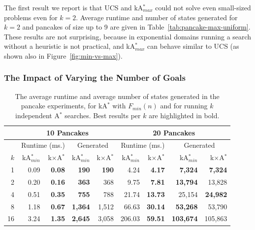 \documentclass{aicom2e}
\newcommand{\astar}{A$^*$}
\newcommand{\kastar}{kA$^*$}
\newcommand{\kastarmin}{kA$^*_{min}$}
\newcommand{\kastarmax}{kA$^*_{max}$}
\newcommand{\kxastar}{k$\times$A$^*$}
\newcommand{\minf}{$F_{min}(n)$}
\begin{document}
The first result we report is that UCS and \kastarmax{} could not solve even
small-sized problems even for $k=2$. Average runtime and number of states
generated  for $k=2$ and pancakes of size up to 9 are given in
Table~\ref{tab:pancake-max-uniform}. These results are not surprising, because
in exponential domains running a search without a heuristic is not practical,
and \kastarmax{} can behave similar to UCS (as shown also in
Figure~\ref{fig:min-vs-max}).


\subsubsection{The Impact of Varying the Number of Goals}


\begin{table}[]


            \centering
        \begin{tabular}{|r|r|r|r|r|r|r|r|r|}
            \hline
            & \multicolumn{4}{c|}{{\bf 10 Pancakes}} & \multicolumn{4}{c|}{{\bf 20 Pancakes}}    \\
            \hline
            & \multicolumn{2}{c|}{Runtime (ms.)}   & \multicolumn{2}{c|}{Generated}    & \multicolumn{2}{c|}{Runtime (ms.)}   & \multicolumn{2}{c|}{Generated}    \\
            \hline
            $k$ & \kastarmin{} & \kxastar{} & \kastarmin{} & \kxastar{} & \kastarmin{} & \kxastar{} & \kastarmin{} & \kxastar{}  \\ \hline

1           & 0.09                  & \textbf{0.08}       & \textbf{190}          & \textbf{190}        & 4.24                  & \textbf{4.17}       & \textbf{7,324}        & \textbf{7,324}      \\
2           & 0.20                  & \textbf{0.16}       & \textbf{363}          & 368                 & 9.75                  & \textbf{7.81}       & \textbf{13,794}       & 13,828              \\
4           & 0.51                  & \textbf{0.35}       & \textbf{755}          & 788                 & 21.74                 & \textbf{13.73}      & 25,154                & \textbf{24,982}     \\
8           & 1.18                  & \textbf{0.67}       & \textbf{1,364}        & 1,512               & 66.63                 & \textbf{30.14}      & \textbf{53,268}       & 53,790              \\
16          & 3.24                  & \textbf{1.35}       & \textbf{2,645}        & 3,058               & 206.03                & \textbf{59.51}      & \textbf{103,674}       & 105,863     \\ \hline
    \end{tabular}
    \caption{The average runtime and average number of states generated in the pancake experiments, for \kastar{} with \minf{} and for running $k$ independent \astar{} searches. Best results per $k$ are highlighted in bold.}
    \label{tab:pancake-minf-k-searches}
  \end{table}
\end{document}
